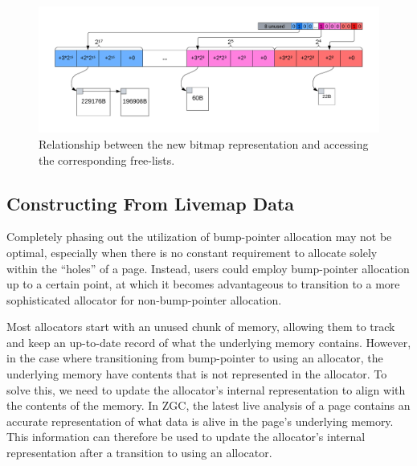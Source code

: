 \begin{figure}[H]
    \centering
    \includegraphics[width=1\textwidth]{figures/bitmap_relationship.png}
    \caption{Relationship between the new bitmap representation and accessing the corresponding free-lists.}
    \label{fig:bitmap_relationship}
\end{figure}



\subsection{Constructing From Livemap Data}

Completely phasing out the utilization of bump-pointer allocation may not be optimal, especially when there is no constant requirement to allocate solely within the ``holes'' of a page. Instead, users could employ bump-pointer allocation up to a certain point, at which it becomes advantageous to transition to a more sophisticated allocator for non-bump-pointer allocation.

Most allocators start with an unused chunk of memory, allowing them to track and keep an up-to-date record of what the underlying memory contains. However, in the case where transitioning from bump-pointer to using an allocator, the underlying memory have contents that is not represented in the allocator. To solve this, we need to update the allocator's internal representation to align with the contents of the memory. In ZGC, the latest live analysis of a page contains an accurate representation of what data is alive in the page's underlying memory. This information can therefore be used to update the allocator's internal representation after a transition to using an allocator.


